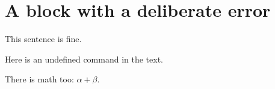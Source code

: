 \section{A block with a deliberate error}

This sentence is fine.

Here is an undefined command \undefinedmacro in the text.

There is math too: $\alpha + \beta$.

